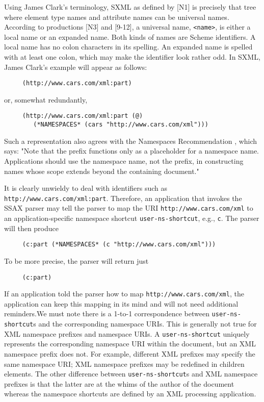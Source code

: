 \documentclass[10pt]{article}
\begin{document}
Using James Clark's terminology, SXML as defined by [N1] is
precisely that tree where element type names and attribute names can
be universal names.  According to productions [N3] and [9-12], a
universal name, \texttt{<name>}, is either a local name or an expanded
name. Both kinds of names are Scheme identifiers. A local name has no
colon characters in its spelling. An expanded name is spelled with at
least one colon, which may make the identifier look rather odd. In
SXML, James Clark's example will appear as follows:\begin{verbatim}
     (http://www.cars.com/xml:part)
\end{verbatim}
or, somewhat redundantly, \begin{verbatim}
     (http://www.cars.com/xml:part (@)
        (*NAMESPACES* (cars "http://www.cars.com/xml")))
\end{verbatim}


Such a representation also agrees with the Namespaces Recommendation \cite{XML Namespaces}, which says: "Note that the prefix
functions only as a placeholder for a namespace name. Applications
should use the namespace name, not the prefix, in constructing names
whose scope extends beyond the containing document."

It is clearly unwieldy to deal with identifiers such as \texttt{http://www.cars.com/xml:part}. Therefore, an application that
invokes the SSAX parser may tell the parser to map the URI \texttt{http://www.cars.com/xml} to an application-specific namespace shortcut \texttt{user-ns-shortcut}, e.g., \texttt{c}. The parser will then produce\begin{verbatim}
     (c:part (*NAMESPACES* (c "http://www.cars.com/xml")))
\end{verbatim}
To be more precise, the parser will return just\begin{verbatim}
     (c:part)
\end{verbatim}
If an application told the parser how to map \texttt{http://www.cars.com/xml}, the application can keep this mapping in
its mind and will not need additional reminders.We must note there is a 1-to-1 correspondence between \texttt{user-ns-shortcut}s and the corresponding namespace URIs. This is generally not true
for XML namespace prefixes and namespace URIs. A \texttt{user-ns-shortcut} uniquely represents the corresponding namespace
URI within the document, but an XML namespace prefix does not. For
example, different XML prefixes may specify the same namespace
URI; XML namespace prefixes may be redefined in children elements. The
other difference between \texttt{user-ns-shortcut}s and
XML namespace prefixes is that the latter are at the whims of the author
of the document whereas the namespace shortcuts are defined by an
XML processing application.
\end{document}
